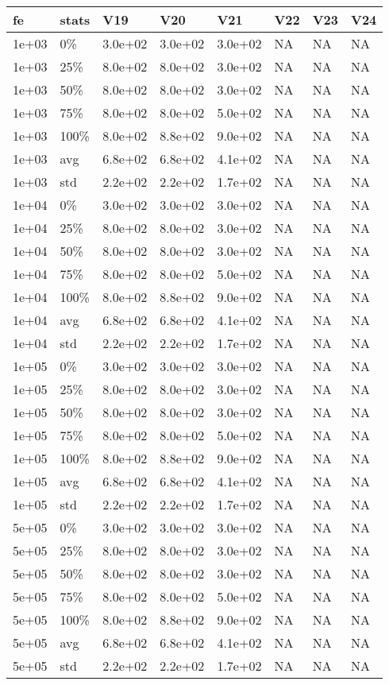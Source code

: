 \documentclass[11pt]{article}
\begin{document}
\begin{longtable}{llllllll}
  \hline
fe & stats & V19 & V20 & V21 & V22 & V23 & V24 \\ 
  \hline
1e+03 & 0\% & 3.0e+02 & 3.0e+02 & 3.0e+02 & NA & NA & NA \\ 
  1e+03 & 25\% & 8.0e+02 & 8.0e+02 & 3.0e+02 & NA & NA & NA \\ 
  1e+03 & 50\% & 8.0e+02 & 8.0e+02 & 3.0e+02 & NA & NA & NA \\ 
  1e+03 & 75\% & 8.0e+02 & 8.0e+02 & 5.0e+02 & NA & NA & NA \\ 
  1e+03 & 100\% & 8.0e+02 & 8.8e+02 & 9.0e+02 & NA & NA & NA \\ 
  1e+03 & avg & 6.8e+02 & 6.8e+02 & 4.1e+02 & NA & NA & NA \\ 
  1e+03 & std & 2.2e+02 & 2.2e+02 & 1.7e+02 & NA & NA & NA \\ 
  1e+04 & 0\% & 3.0e+02 & 3.0e+02 & 3.0e+02 & NA & NA & NA \\ 
  1e+04 & 25\% & 8.0e+02 & 8.0e+02 & 3.0e+02 & NA & NA & NA \\ 
  1e+04 & 50\% & 8.0e+02 & 8.0e+02 & 3.0e+02 & NA & NA & NA \\ 
  1e+04 & 75\% & 8.0e+02 & 8.0e+02 & 5.0e+02 & NA & NA & NA \\ 
  1e+04 & 100\% & 8.0e+02 & 8.8e+02 & 9.0e+02 & NA & NA & NA \\ 
  1e+04 & avg & 6.8e+02 & 6.8e+02 & 4.1e+02 & NA & NA & NA \\ 
  1e+04 & std & 2.2e+02 & 2.2e+02 & 1.7e+02 & NA & NA & NA \\ 
  1e+05 & 0\% & 3.0e+02 & 3.0e+02 & 3.0e+02 & NA & NA & NA \\ 
  1e+05 & 25\% & 8.0e+02 & 8.0e+02 & 3.0e+02 & NA & NA & NA \\ 
  1e+05 & 50\% & 8.0e+02 & 8.0e+02 & 3.0e+02 & NA & NA & NA \\ 
  1e+05 & 75\% & 8.0e+02 & 8.0e+02 & 5.0e+02 & NA & NA & NA \\ 
  1e+05 & 100\% & 8.0e+02 & 8.8e+02 & 9.0e+02 & NA & NA & NA \\ 
  1e+05 & avg & 6.8e+02 & 6.8e+02 & 4.1e+02 & NA & NA & NA \\ 
  1e+05 & std & 2.2e+02 & 2.2e+02 & 1.7e+02 & NA & NA & NA \\ 
  5e+05 & 0\% & 3.0e+02 & 3.0e+02 & 3.0e+02 & NA & NA & NA \\ 
  5e+05 & 25\% & 8.0e+02 & 8.0e+02 & 3.0e+02 & NA & NA & NA \\ 
  5e+05 & 50\% & 8.0e+02 & 8.0e+02 & 3.0e+02 & NA & NA & NA \\ 
  5e+05 & 75\% & 8.0e+02 & 8.0e+02 & 5.0e+02 & NA & NA & NA \\ 
  5e+05 & 100\% & 8.0e+02 & 8.8e+02 & 9.0e+02 & NA & NA & NA \\ 
  5e+05 & avg & 6.8e+02 & 6.8e+02 & 4.1e+02 & NA & NA & NA \\ 
  5e+05 & std & 2.2e+02 & 2.2e+02 & 1.7e+02 & NA & NA & NA \\ 
   \hline
\hline
\end{longtable}
\end{document}
